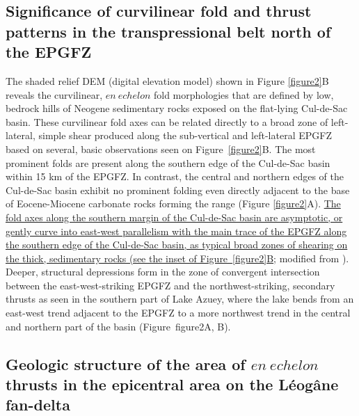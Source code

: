 \documentclass[linenumbers,draft]{agujournal}
\begin{document}
\subsection{Significance of curvilinear fold and thrust patterns in the transpressional belt north of the EPGFZ}
The shaded relief DEM (digital elevation model) shown in Figure \ref{figure2}B reveals the curvilinear, $en~echelon$ fold morphologies that are defined by low, bedrock hills of Neogene sedimentary rocks exposed on the flat-lying Cul-de-Sac basin. These curvilinear fold axes can be related directly to a broad zone of left-lateral, simple shear produced along the sub-vertical and left-lateral EPGFZ based on several, basic observations seen on Figure~\ref{figure2}B. The most prominent folds are present along the southern edge of the Cul-de-Sac basin within 15 km of the EPGFZ. In contrast, the central and northern edges of the Cul-de-Sac basin exhibit no prominent folding even directly adjacent to the base of Eocene-Miocene carbonate rocks forming the range \citep{pubellier2000plate} (Figure \ref{figure2}A). \ul{The fold axes along the southern margin of the Cul-de-Sac basin are asymptotic, or gently curve into east-west parallelism with the main trace of the EPGFZ along the southern edge of the Cul-de-Sac basin, as typical broad zones of shearing on the thick, sedimentary rocks (see the inset of Figure~{\ref{figure2}}B}; modified from \citet{odonne1983analogue}). Deeper, structural depressions form in the zone of convergent intersection between the east-west-striking EPGFZ and the northwest-striking, secondary thrusts as seen in the southern part of Lake Azuey, where the lake bends from an east-west trend adjacent to the EPGFZ to a more northwest trend in the central and northern part of the basin (Figure~{figure2}A, B).

\subsection{Geologic structure of the area of $en~echelon$ thrusts in the epicentral area on the L\'eog\^ane fan-delta}
\end{document}
